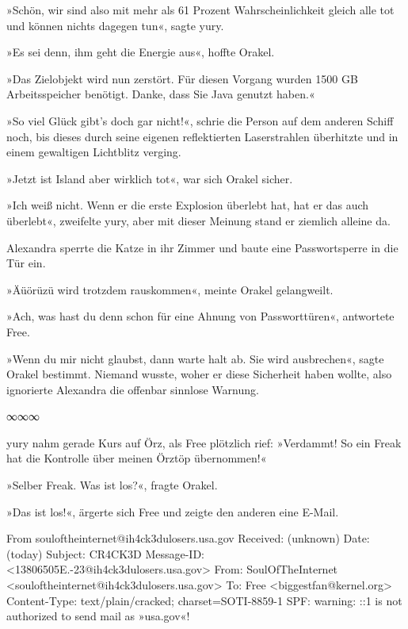 »Schön, wir sind also mit mehr als 61 Prozent Wahrscheinlichkeit gleich alle tot und können nichts dagegen tun«, sagte yury.

»Es sei denn, ihm geht die Energie aus«, hoffte Orakel.


»Das Zielobjekt wird nun zerstört. Für diesen Vorgang wurden 1500 GB Arbeitsspeicher benötigt. Danke, dass Sie Java genutzt haben.«


»So viel Glück gibt’s doch gar nicht!«, schrie die Person auf dem anderen Schiff noch, bis dieses durch seine eigenen reflektierten Laserstrahlen überhitzte und in einem gewaltigen Lichtblitz verging.

»Jetzt ist Island aber wirklich tot«, war sich Orakel sicher.

»Ich weiß nicht. Wenn er die erste Explosion überlebt hat, hat er das auch überlebt«, zweifelte yury, aber mit dieser Meinung stand er ziemlich alleine da.

Alexandra sperrte die Katze in ihr Zimmer und baute eine Passwortsperre in die Tür ein.

»Äüörüzü wird trotzdem rauskommen«, meinte Orakel gelangweilt.

»Ach, was hast du denn schon für eine Ahnung von Passworttüren«, antwortete Free.

»Wenn du mir nicht glaubst, dann warte halt ab. Sie wird ausbrechen«, sagte Orakel bestimmt. Niemand wusste, woher er diese Sicherheit haben wollte, also ignorierte Alexandra die offenbar sinnlose Warnung.

\begin{center}
    ∞∞∞
\end{center}

yury nahm gerade Kurs auf Örz, als Free plötzlich rief: »Verdammt! So ein Freak hat die Kontrolle über meinen Örztöp übernommen!«

»Selber Freak. Was ist los?«, fragte Orakel.

»Das ist los!«, ärgerte sich Free und zeigte den anderen eine E-Mail.

\newpage

\noindent \parbox{\textwidth}{

    \begin{footnotesize}
    \begin{ttfamily}

From souloftheinternet@ih4ck3dulosers.usa.gov
Received: (unknown)
Date: (today)
Subject: CR4CK3D
Message-ID: <13806505E.-23@ih4ck3dulosers.usa.gov>
From: SoulOfTheInternet <souloftheinternet@ih4ck3dulosers.usa.gov>
To: Free <biggestfan@kernel.org>
Content-Type: text/plain/cracked; charset=SOTI-8859-1
SPF: warning: ::1 is not authorized to send mail as »usa.gov«!

    \end{ttfamily}
    \end{footnotesize}

\vspace{3ex} } %

